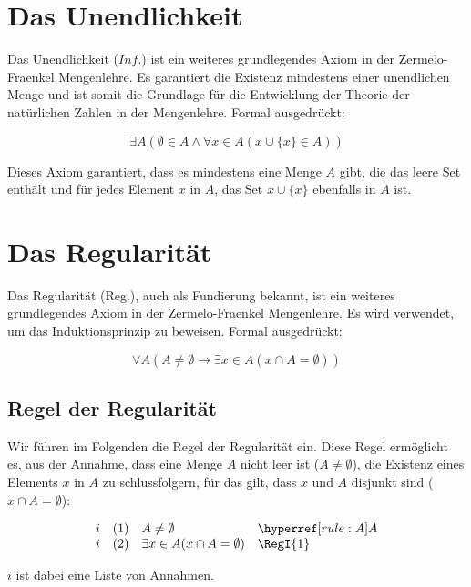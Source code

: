 \documentclass[main.tex]{subfiles}
\begin{document}
\chapter{Das Unendlichkeit}

Das Unendlichkeit (\(Inf.\)) ist ein weiteres grundlegendes Axiom in der Zermelo-Fraenkel Mengenlehre. Es garantiert die Existenz mindestens einer unendlichen Menge und ist somit die Grundlage für die Entwicklung der Theorie der natürlichen Zahlen in der Mengenlehre. Formal ausgedrückt:

\label{ExALpEmptysetInAAndFaxInALpxcuLbxRbInARpRp}
\[
\exists A (\emptyset \in A \land \forall x\in A (x \cup \{x\} \in A))
\]

Dieses Axiom garantiert, dass es mindestens eine Menge \( A \) gibt, die das leere Set enthält und für jedes Element \( x \) in \( A \), das Set \( x \cup \{x\} \) ebenfalls in \( A \) ist.

\chapter{Das Regularität}
\label{rule:Regularity}
Das Regularität (Reg.), auch als Fundierung bekannt, ist ein weiteres grundlegendes Axiom in der Zermelo-Fraenkel Mengenlehre. Es wird verwendet, um das Induktionsprinzip zu beweisen. Formal ausgedrückt:

\label{FaALpANotEqualsEmptysetToExxInALpxcaAEqualsEmptysetRpRp}
\[
\forall A (A \neq \emptyset \rightarrow \exists x\in A (x \cap A = \emptyset))
\]

\section{Regel der Regularität}
\label{rule:RegI}

Wir führen im Folgenden die Regel der Regularität ein. Diese Regel ermöglicht es, aus der Annahme, dass eine Menge \(A\) nicht leer ist (\(A \neq \emptyset\)), die Existenz eines Elements \(x\) in \(A\) zu schlussfolgern, für das gilt, dass \(x\) und \(A\) disjunkt sind (\(x \cap A = \emptyset\)):

\[
\begin{array}{llll}
	i & (1) & A \neq \emptyset & \rA \\
	i & (2) & \exists x \in A (x \cap A = \emptyset) & \RegI{1} \\
\end{array}
\]

\(i\) ist dabei eine Liste von Annahmen.
\end{document}
